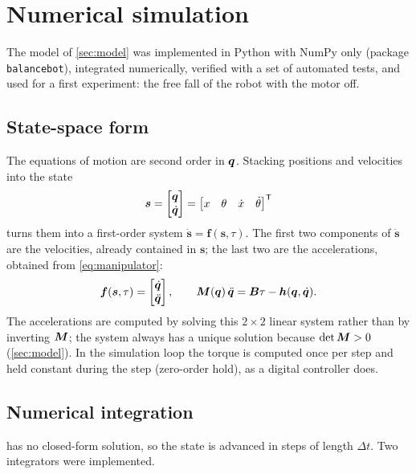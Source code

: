 \section{Numerical simulation}\label{sec:sim}

The model of \cref{sec:model} was implemented in Python with NumPy only
(package \texttt{balancebot}), integrated numerically, verified with a set of
automated tests, and used for a first experiment: the free fall of the robot
with the motor off.

\subsection{State-space form}

The equations of motion are second order in $\bm{q}$. Stacking positions and
velocities into the state
\begin{equation}
  \bm{s} = \begin{bmatrix} \bm{q} \\ \dot{\bm{q}} \end{bmatrix}
  = \begin{bmatrix} x & \theta & \dot x & \dot\theta \end{bmatrix}^{\mathsf T}
\end{equation}
turns them into a first-order system $\dot{\bm s} = \bm f(\bm s, \tau)$. The
first two components of $\dot{\bm s}$ are the velocities, already contained in
$\bm s$; the last two are the accelerations, obtained from \cref{eq:manipulator}:
\begin{equation}
  \bm f(\bm s, \tau) = \begin{bmatrix} \dot{\bm{q}} \\ \ddot{\bm{q}} \end{bmatrix},
  \qquad \bm{M}(\bm{q})\,\ddot{\bm{q}} = \bm{B}\tau - \bm{h}(\bm{q},\dot{\bm{q}}) .
  \label{eq:forward}
\end{equation}
The accelerations are computed by solving this $2\times2$ linear system rather
than by inverting $\bm{M}$; the system always has a unique solution because
$\det\bm{M} > 0$ (\cref{sec:model}). In the simulation loop the torque is computed
once per step and held constant during the step (zero-order hold), as a digital
controller does.

\subsection{Numerical integration}

 has no closed-form solution, so the state is advanced in
steps of length $\Delta t$. Two integrators were implemented.

